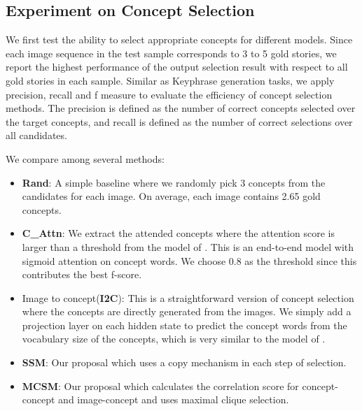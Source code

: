\subsection{Experiment on Concept Selection}
We first test the ability to select appropriate concepts for different models.
Since each image sequence in the test sample corresponds to 3 to 5 gold stories, we report the highest performance of the output selection result with respect to all gold stories in each sample. 
Similar as Keyphrase generation tasks, we apply precision, recall and f measure to evaluate the efficiency of concept selection methods. The precision is defined as the number of correct concepts selected over the target concepts, and recall is defined as the number of correct selections over all candidates.



We compare among several methods:
\begin{itemize}[noitemsep]
    \item \textbf{Rand}: A simple baseline where we randomly pick 3 concepts from the candidates for each image. On average, each image contains 2.65 gold concepts.
    \item \textbf{C\_Attn}: We extract the attended concepts where the attention score is larger than a threshold from the model of \citet{yang2019knowledgeable}. This is an end-to-end model with sigmoid attention on concept words. We choose 0.8 as the threshold since this contributes the best f-score.
    \item Image to concept(\textbf{I2C}): This is a straightforward version of concept selection where the concepts are directly generated from the images. We simply add a projection layer on each hidden state to predict the concept words from the vocabulary size of the concepts, which is very similar to the model of \citet{hsu2019knowledge}.
    \item \textbf{SSM}: Our proposal which uses a copy mechanism in each step of selection.
    \item \textbf{MCSM}: Our proposal which calculates the correlation score for concept-concept and image-concept and uses maximal clique selection.
\end{itemize}


